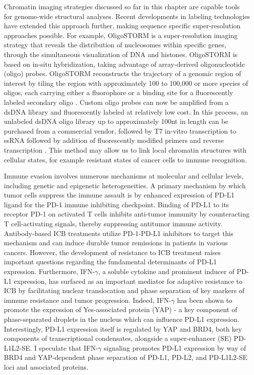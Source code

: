 Chromatin imaging strategies discussed so far in this chapter are capable tools for genome-wide structural analyses. Recent developments in labeling technologies have extended this approach further, making sequence specific super-resolution approaches possible. For example, OligoSTORM \parencite{Beliveau2017} is a super-resolution imaging strategy that reveals the distribution of nucleosomes within specific genes, through the simultaneous visualization of DNA and histones. OligoSTORM is based on in-situ hybridization, taking advantage of array-derived oligonucleotide (oligo) probes. OligoSTORM reconstructs the trajectory of a genomic region of interest by tiling the region with approximately 100 to 100,000 or more species of oligos, each carrying either a fluorophore or a binding site for a fluorescently labeled secondary oligo \parencite{Boettiger2016, Beliveau2017}. Custom oligo probes can now be amplified from a dsDNA library and fluorescently labeled at relatively low cost. In this process, an unlabeled dsDNA oligo library up to approximately 100nt in length can be purchased from a commercial vendor, followed by T7 in-vitro transcription to ssRNA followed by addition of fluorescently modified primers and reverse transcription \parencite{Murgha2015,Boettiger2020}. This method may allow us to link local chromatin structures with cellular states, for example resistant states of cancer cells to immune recognition.

Immune evasion involves numerous mechanisms at molecular and cellular levels, including genetic and epigenetic heterogeneities. A primary mechanism by which tumor cells suppress the immune assault is by enhanced expression of PD-L1 ligand for the PD-1 immune inhibiting checkpoint. Binding of PD-L1 to its receptor PD-1 on activated T cells inhibits anti-tumor immunity by counteracting T cell-activating signals, thereby suppressing antitumor immune activity. Antibody-based ICB treatments utilize PD-1-PD-L1 inhibitors to target this mechanism and can induce durable tumor remissions in patients in various cancers. However, the development of resistance to ICB treatment raises important questions regarding the fundamental determinants of PD-L1 expression. Furthermore, IFN-$\gamma$, a soluble cytokine and prominent inducer of PD-L1 expression, has surfaced as an important mediator for adaptive resistance to ICB by facilitating nuclear translocation and phase separation of key markers of immune resistance and tumor progression. Indeed, IFN-$\gamma$ has been shown to promote the expression of Yes-associated protein (YAP) - a key component of phase-separated droplets in the nucleus which can influence PD-L1 expression. Interestingly, PD-L1 expression itself is regulated by YAP and BRD4, both key components of transcriptional condensates, alongside a super-enhancer (SE) PD-L1L2-SE. I speculate that IFN-$\gamma$ signaling promotes PD-L1 expression by way of BRD4 and YAP-dependent phase separation of PD-L1, PD-L2, and PD-L1L2-SE loci and associated proteins.

